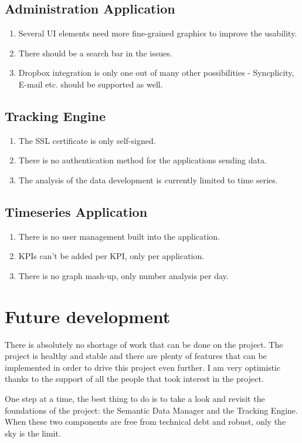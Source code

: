 \subsection{Administration Application}

\begin{enumerate}
	\item Several UI elements need more fine-grained graphics to improve the usability.
	\item There should be a search bar in the issues.
	\item Dropbox integration is only one out of many other possibilities - Syncplicity, E-mail etc. should be supported as well.
\end{enumerate}

\subsection{Tracking Engine}

\begin{enumerate}
	\item The SSL certificate is only self-signed.
	\item There is no authentication method for the applications sending data.
	\item The analysis of the data development is currently limited to time series.
\end{enumerate}

\subsection{Timeseries Application}

\begin{enumerate}
	\item There is no user management built into the application.
	\item KPIs can't be added per KPI, only per application.
	\item There is no graph mash-up, only number analysis per day.
\end{enumerate}

\section{Future development}

There is absolutely no shortage of work that can be done on the project. The project is healthy and stable and there are plenty of features that can be implemented in order to drive this project even further. I am very optimistic thanks to the support of all the people that took interest in the project. 

One step at a time, the best thing to do is to take a look and revisit the foundations of the project: the Semantic Data Manager and the Tracking Engine. When these two components are free from technical debt and robust, only the sky is the limit.